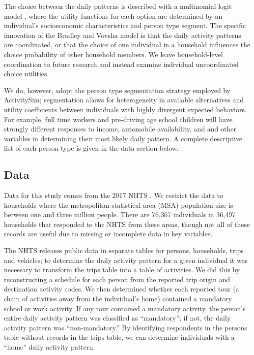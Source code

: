 \documentclass[3p, authoryear, review]{elsarticle} %
\begin{document}
The choice between the daily patterns is described with a multinomial logit
model \cite{Domencich1975}, where the utility functions for each option are
determined by an individual's socioeconomic characteristics and person type
segment. The specific innovation of the Bradley and Vovsha model
\cite{Bradley2005} is that the daily activity patterns are coordinated, or that
the choice of one individual in a household influences the choice probability of
other household members. We leave household-level coordination to future
research and instead examine individual uncoordinated choice utilities.

We do, however, adopt the person type segmentation strategy employed by
ActivitySim; segmentation allows for heterogeneity in available
alternatives and utility coefficients between individuals with highly divergent
expected behaviors. For example, full time workers and pre-driving age school children
will have strongly different responses to income, automobile availability, and
and other variables in determining their most likely daily pattern.
A complete descriptive list of each person type is given in the data
section below.

\hypertarget{data}{%
\subsection{Data}\label{data}}

Data for this study comes from the 2017 NHTS \cite{nhts2017}. We restrict the
data to households where the metropolitan statistical area (MSA) population size
is between one and three million people. There are 76,367 individuals in 36,497
households that responded to the NHTS from these areas, though not all of these
records are useful due to missing or incomplete data in key variables.

The NHTS releases public data in separate tables for persons, households,
trips and vehicles; to determine the daily activity pattern for a given
individual it was necessary to transform the trips table into a table of
activities. We did this by reconstructing a schedule for each person from the
reported trip origin and destination activity codes. We then determined whether
each reported tour (a chain of activities away from the individual's home)
contained a mandatory school or work activity. If any tour contained a mandatory
activity, the person's entire daily activity pattern was classified as ``mandatory'';
if not, the daily activity pattern was ``non-mandatory.'' By identifying respondents
in the persons table without records in the trips table, we can determine
individuals with a ``home'' daily activity pattern.
\end{document}
